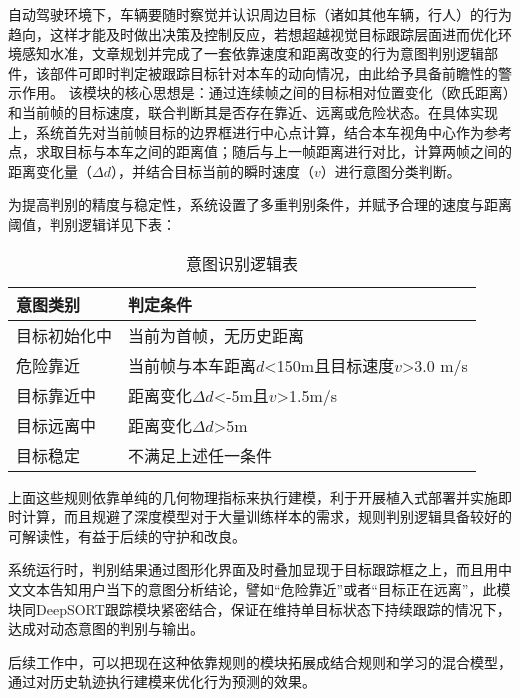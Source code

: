 自动驾驶环境下，车辆要随时察觉并认识周边目标（诸如其他车辆，行人）的行为趋向，这样才能及时做出决策及控制反应，若想超越视觉目标跟踪层面进而优化环境感知水准，文章规划并完成了一套依靠速度和距离改变的行为意图判别逻辑部件，该部件可即时判定被跟踪目标针对本车的动向情况，由此给予具备前瞻性的警示作用。
该模块的核心思想是：通过连续帧之间的目标相对位置变化（欧氏距离）和当前帧的目标速度，联合判断其是否存在靠近、远离或危险状态。在具体实现上，系统首先对当前帧目标的边界框进行中心点计算，结合本车视角中心作为参考点，求取目标与本车之间的距离值；随后与上一帧距离进行对比，计算两帧之间的距离变化量（$\Delta d$），并结合目标当前的瞬时速度（$v$）进行意图分类判断。

为提高判别的精度与稳定性，系统设置了多重判别条件，并赋予合理的速度与距离阈值，判别逻辑详见下表：

\begin{table}[htbp]
  \caption{意图识别逻辑表}
  \label{tab:timetable}
  \centering
  \begin{tabular}{ll}
    \toprule
    意图类别 & 判定条件 \\
    \midrule
    目标初始化中 & 当前为首帧，无历史距离 \\
    危险靠近 & 当前帧与本车距离$d$<150m且目标速度$v$>3.0 m/s \\
    目标靠近中 & 距离变化$\Delta d$<-5m且$v$>1.5m/s \\
    目标远离中 & 距离变化$\Delta d$>5m \\
    目标稳定 & 不满足上述任一条件 \\
    \bottomrule
  \end{tabular}
\end{table}

上面这些规则依靠单纯的几何物理指标来执行建模，利于开展植入式部署并实施即时计算，而且规避了深度模型对于大量训练样本的需求，规则判别逻辑具备较好的可解读性，有益于后续的守护和改良。

系统运行时，判别结果通过图形化界面及时叠加显现于目标跟踪框之上，而且用中文文本告知用户当下的意图分析结论，譬如“危险靠近”或者“目标正在远离”，此模块同DeepSORT跟踪模块紧密结合，保证在维持单目标状态下持续跟踪的情况下，达成对动态意图的判别与输出。

后续工作中，可以把现在这种依靠规则的模块拓展成结合规则和学习的混合模型，通过对历史轨迹执行建模来优化行为预测的效果。




\begin{tabular}{l l}
\end{tabular}
